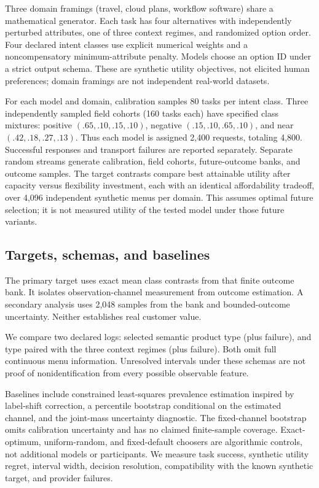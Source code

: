 \documentclass[10pt,twocolumn]{article}
\theoremstyle{definition}\newtheorem{definition}[theorem]{Definition}
\newcommand{\1}{\mathbf 1}
\begin{document}
Three domain framings (travel, cloud plans, workflow software) share a mathematical generator. Each task has four alternatives with independently perturbed attributes, one of three context regimes, and randomized option order. Four declared intent classes use explicit numerical weights and a noncompensatory minimum-attribute penalty. Models choose an option ID under a strict output schema. These are synthetic utility objectives, not elicited human preferences; domain framings are not independent real-world datasets.

For each model and domain, calibration samples 80 tasks per intent class. Three independently sampled field cohorts (160 tasks each) have specified class mixtures: positive $(.65,.10,.15,.10)$, negative $(.15,.10,.65,.10)$, and near $(.42,.18,.27,.13)$. Thus each model is assigned 2,400 requests, totaling 4,800. Successful responses and transport failures are reported separately. Separate random streams generate calibration, field cohorts, future-outcome banks, and outcome samples. The target contrasts compare best attainable utility after capacity versus flexibility investment, each with an identical affordability tradeoff, over 4,096 independent synthetic menus per domain. This assumes optimal future selection; it is not measured utility of the tested model under those future variants.

\subsection{Targets, schemas, and baselines}
The primary target uses exact mean class contrasts from that finite outcome bank. It isolates observation-channel measurement from outcome estimation. A secondary analysis uses 2,048 samples from the bank and bounded-outcome uncertainty. Neither establishes real customer value.

We compare two declared logs: selected semantic product type (plus failure), and type paired with the three context regimes (plus failure). Both omit full continuous menu information. Unresolved intervals under these schemas are not proof of nonidentification from every possible observable feature.

Baselines include constrained least-squares prevalence estimation inspired by label-shift correction, a percentile bootstrap conditional on the estimated channel, and the joint-mass uncertainty diagnostic. The fixed-channel bootstrap omits calibration uncertainty and has no claimed finite-sample coverage. Exact-optimum, uniform-random, and fixed-default choosers are algorithmic controls, not additional models or participants. We measure task success, synthetic utility regret, interval width, decision resolution, compatibility with the known synthetic target, and provider failures.
\end{document}
